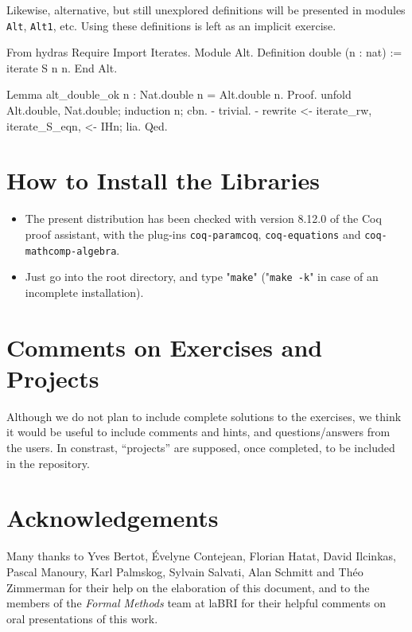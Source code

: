 \documentclass[a4paper]{book}
\begin{document}
Likewise, alternative, but still unexplored definitions will be presented in modules
\texttt{Alt}, \texttt{Alt1}, etc. Using these definitions is left as an implicit exercise.


\begin{Coqalt}
From hydras Require Import Iterates.
Module Alt.
  Definition double (n : nat) := iterate S n n.
End Alt.
\end{Coqalt}

\begin{Coqsrc}
Lemma alt_double_ok n : Nat.double n = Alt.double n.
Proof.
  unfold Alt.double, Nat.double; induction n; cbn.
  -  trivial.
  -  rewrite <- iterate_rw, iterate_S_eqn, <- IHn; lia.
Qed.
\end{Coqsrc}






\section{How to Install the Libraries}
\label{sec:orgheadline4}
\begin{itemize}
\item The present distribution has been checked with version 8.12.0 of the Coq proof assistant, with the plug-ins \texttt{coq-paramcoq}, \texttt{coq-equations}
and \texttt{coq-mathcomp-algebra}.

\item Just go into the root directory, and type "\texttt{make}" ("\texttt{make -k}"  in case of an incomplete installation).
\end{itemize}

\section{Comments on Exercises and Projects}

Although we do not plan to include complete solutions to the exercises, 
we think it would be useful to include comments and hints, and questions/answers from the users. In constrast, ``projects'' are supposed, once completed, to be included in the repository.


\section{Acknowledgements}
\label{sec:orgheadline5}
    Many thanks to Yves Bertot, \'Evelyne Contejean,  Florian Hatat,  David Ilcinkas, 
Pascal Manoury,  Karl Palmskog, Sylvain Salvati, Alan Schmitt and Théo Zimmerman for their help on the elaboration of this document, and to the
 members of the \emph{Formal Methods} team at laBRI for their helpful comments 
on  oral presentations of this work. 
\end{document}
